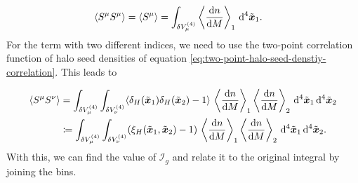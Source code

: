 \documentclass[../main.tex]{subfiles}
\begin{document}
\begin{align}
    \langle S^\mu  S^\mu \rangle = \langle S^\mu \rangle &= \int_{\delta V^{(4)}_\mu} \left\langle \frac{\mathrm{d} n}{\mathrm{d} M} \right\rangle_1 \,\mathrm{d}^4 \tilde{\boldsymbol{x}}_1.
\end{align}
For the term with two different indices, we need to use the two-point correlation function of halo seed densities of equation \ref{eq:two-point-halo-seed-denstiy-correlation}. This leads to 

\begin{align}
    \langle S^\mu  S^\nu \rangle &= \int_{\delta V^{(4)}_\mu} \int_{\delta V^{(4)}_\nu} \langle \delta_H(\tilde{\boldsymbol{x}}_1) \delta_H(\tilde{\boldsymbol{x}}_2) -1 \rangle\,\left\langle \frac{\mathrm{d} n}{\mathrm{d} M} \right\rangle_1 \left\langle \frac{\mathrm{d} n}{\mathrm{d} M} \right\rangle_2\,\mathrm{d}^4 \tilde{\boldsymbol{x}}_1 \, \mathrm{d}^4 \tilde{\boldsymbol{x}}_2\\
&\coloneqq \int_{\delta V^{(4)}_\mu} \int_{\delta V^{(4)}_\nu} ( \xi_H(\tilde{\boldsymbol{x}}_1,\tilde{\boldsymbol{x}}_2) -1 )\,\left\langle \frac{\mathrm{d} n}{\mathrm{d} M} \right\rangle_1 \left\langle \frac{\mathrm{d} n}{\mathrm{d} M} \right\rangle_2\,\mathrm{d}^4 \tilde{\boldsymbol{x}}_1 \, \mathrm{d}^4 \tilde{\boldsymbol{x}}_2.
\end{align}
With this, we can find the value of $\mathcal{I}_g$ and relate it to the original integral by joining the bins.
\end{document}
